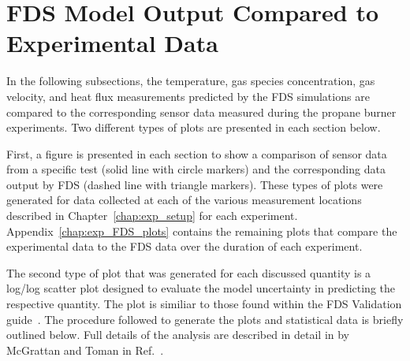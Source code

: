 \section{FDS Model Output Compared to Experimental Data}
In the following subsections, the temperature, gas species concentration, gas velocity, and heat flux measurements predicted by the FDS simulations are compared to the corresponding sensor data measured during the propane burner experiments. Two different types of plots are presented in each section below. 

First, a figure is presented in each section to show a comparison of sensor data from a specific test (solid line with circle markers) and the corresponding data output by FDS (dashed line with triangle markers). These types of plots were generated for data collected at each of the various measurement locations described in Chapter~\ref{chap:exp_setup} for each experiment. Appendix~\ref{chap:exp_FDS_plots} contains the remaining plots that compare the experimental data to the FDS data over the duration of each experiment. 

The second type of plot that was generated for each discussed quantity is a log/log scatter plot designed to evaluate the model uncertainty in predicting the respective quantity. The plot is similiar to those found within the FDS Validation guide~\cite{FDS_Validation_Guide}. The procedure followed to generate the plots and statistical data is briefly outlined below. Full details of the analysis are described in detail in by McGrattan and Toman in Ref.~\cite{McGrattan:Metrologia}.

